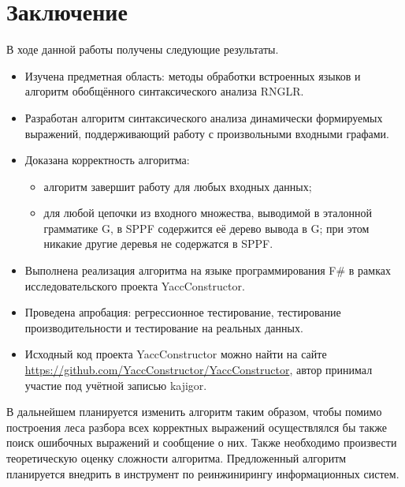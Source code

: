 \section*{Заключение}
В ходе данной работы получены следующие результаты. 
\begin{itemize}
  \item Изучена предметная область: методы обработки встроенных языков и алгоритм обобщённого синтаксического анализа RNGLR.
  \item Разработан алгоритм синтаксического анализа динамически формируемых выражений, поддерживающий работу с произвольными входными графами.
  \item Доказана корректность алгоритма:
  \begin{itemize}
    \item алгоритм завершит работу для любых входных данных;
    \item для любой цепочки из входного множества, выводимой в эталонной грамматике G, в SPPF содержится её дерево вывода в G; при этом никакие другие деревья не содержатся в SPPF.
  \end{itemize}
  \item Выполнена реализация алгоритма на языке программирования F\# в рамках исследовательского проекта YaccConstructor.
  \item Проведена апробация: регрессионное тестирование, тестирование производительности и тестирование на реальных данных.
  \item Исходный код проекта YaccConstructor можно найти на сайте \url{https://github.com/YaccConstructor/YaccConstructor}, автор принимал участие под учётной записью kajigor.
\end{itemize}

В дальнейшем планируется изменить алгоритм таким образом, чтобы помимо 
построения леса разбора всех корректных выражений осуществлялся бы также поиск ошибочных выражений и сообщение о них. Также необходимо произвести теоретическую оценку сложности алгоритма. Предложенный алгоритм планируется внедрить в инструмент по реинжинирингу информационных систем.  
